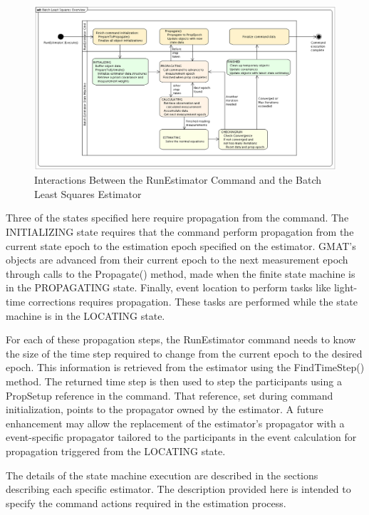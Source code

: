 \begin{figure}[htb]
\begin{center}
\includegraphics[scale=0.4]{Images/BatchLeastSquaresOverview.eps}
\caption{\label{fig:RunEstimatorStateMachine}Interactions Between the RunEstimator Command and the Batch Least Squares Estimator}
\end{center}
\end{figure}

Three of the states specified here require propagation from the command.  The INITIALIZING state requires that the command perform propagation from the current state epoch to the estimation epoch specified on the estimator.  GMAT's objects are advanced from their current epoch to the next measurement epoch through calls to the Propagate() method, made when the finite state machine is in the PROPAGATING state.  Finally, event location to perform tasks like light-time corrections requires propagation.  These tasks are performed while the state machine is in the LOCATING state.

For each of these propagation steps, the RunEstimator command needs to know the size of the time step required to change from the current epoch to the desired epoch.  This information is retrieved from the estimator using the FindTimeStep() method.  The returned time step is then used to step the participants using a PropSetup reference in the command.  That reference, set during command initialization, points to the propagator owned by the estimator.  A future enhancement may allow the replacement of the estimator's propagator with a event-specific propagator tailored to the participants in the event calculation for propagation triggered from the LOCATING state.

The details of the state machine execution are described in the sections describing each specific estimator.  The description provided here is intended to specify the command actions required in the estimation process.

